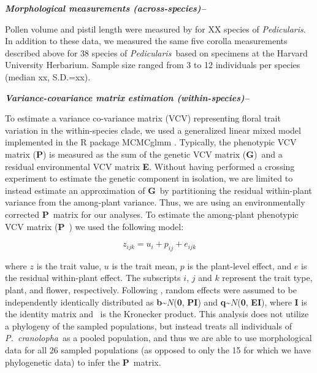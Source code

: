 \documentclass[12pt,letterpaper]{article}
\def\PC{\emph{P.~cranolopha}}
\def\P{\emph{Pedicularis}}
\def\GM{{\bf G}}
\def\PM{{\bf P}}
\def\kronecker{\raisebox{1pt}{\ensuremath{\:\otimes\:}}}
\renewcommand{\subsection}[1]{%
\bigskip
{\noindent \normalfont \bf \emph{#1}}
}
\begin{document}
\subsection{Morphological measurements (across-species)--}
Pollen volume and pistil length were measured by \cite{yang} for XX species of \P. In addition to these data, 
we measured the same five corolla measurements described above for 38 species of \P~based on specimens at the Harvard University Herbarium. %
Sample size ranged from 3 to 12 individuals per species (median xx, S.D.=xx). 

\subsection{Variance-covariance matrix estimation (within-species)--}
To estimate a variance co-variance matrix (VCV) representing floral trait variation in the within-species clade, 
we used a generalized linear mixed model implemented in the R package MCMCglmm \citep{hadfield_2013}. Typically, the phenotypic VCV matrix (\PM) is measured as the sum of the genetic VCV matrix (\GM)~and a residual environmental VCV matrix {\bf E}. Without having performed a crossing experiment to estimate the genetic component in isolation, we are limited to instead estimate an approximation of \GM~by partitioning the residual within-plant variance from the among-plant variance. Thus, we are using an environmentally corrected \PM~matrix for our analyses. To estimate the among-plant phenotypic VCV matrix (\PM~) we used the following model: 

\begin{equation}
z_{ijk} = u_i + p_{ij} + e_{ijk}
\end{equation}

\noindent where $z$ is the trait value, $u$ is the trait mean, $p$ is the plant-level effect, and $e$ is the residual within-plant effect. The subscripts $i$, $j$ and $k$ represent the trait type, plant, and flower, respectively. Following \citep{bolstad_genetic_2014}, random effects were assumed to be independently identically distributed as {\bf b}{\textasciitilde}$N$({\bf 0}, {\bf P}{\kronecker}{\bf I}) and {\bf q}{\textasciitilde}$N$({\bf 0}, {\bf E}{\kronecker}{\bf I}), where {\bf I} is the identity matrix and \kronecker~is the Kronecker product. This analysis does not utilize a phylogeny of the sampled populations, but instead treats all individuals of \PC~as a pooled population, and thus we are able to use morphological data for all 26 sampled populations (as opposed to only the 15 for which we have phylogenetic data) to infer the \PM~matrix.
\end{document}
